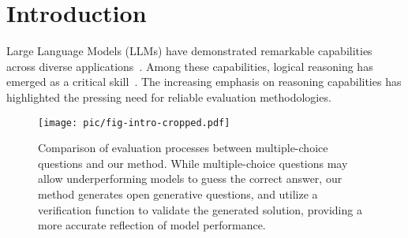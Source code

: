 \section{Introduction}

Large Language Models (LLMs) have demonstrated remarkable capabilities across diverse applications~\cite{openai2024gpt4technicalreport, cluade, qwen2025qwen25technicalreport}. Among these capabilities, logical reasoning has emerged as a critical skill~\cite{luo2023towards,wei2022chain,yao2024tree,zhu2024dynamic}.
The increasing emphasis on reasoning capabilities has highlighted the pressing need for reliable evaluation methodologies.

\begin{figure}[t]
  \centering
  \texttt{[image: pic/fig-intro-cropped.pdf]}

  \caption{Comparison of evaluation processes between multiple-choice questions and our method. While multiple-choice questions may allow underperforming models to guess the correct answer, our method generates open generative questions, and utilize a verification function to validate the generated solution, providing a more accurate reflection of model performance.}
  \label{fig:intro}
\vspace{-5pt}
\end{figure}

